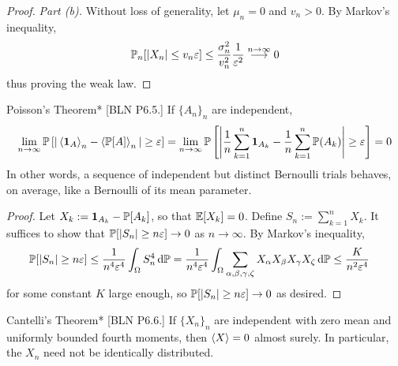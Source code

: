 \begin{proof}
    \emph{Part (b).} Without loss of generality, let \(\mu_n = 0\) and \(v_n > 0\). By Markov's inequality, 
    \[
        \mathbb{P}_n[|X_n| \leq v_n \varepsilon]
        \leq \frac{\sigma_n^2}{v_n^2} \frac{1}{\varepsilon^2} \stackrel{n \to \infty}{\longrightarrow} 0
    \]
    thus proving the weak law. 
\end{proof}


\begin{problem}{Poisson's Theorem}*
    [BLN P6.5.] If \(\{A_n\}_n\) are independent,
    \[
        \lim_{n \to \infty} \bb{P}\left[ |\ev{\mb{1}_A}_n - \ev{\bb{P}[A]}_n | \geq \varepsilon \right]
        = \lim_{n \to \infty} \bb{P}\left[ \left| \frac{1}{n} \sum_{k=1}^n \mb{1}_{A_k} - \frac{1}{n} \sum_{k=1}^n \bb{P}(A_k) \right| \geq \varepsilon \right] 
        = 0
    \]
    In other words, a sequence of independent but distinct Bernoulli trials behaves, on average, like a Bernoulli of its mean parameter.
\end{problem}

\begin{proof}
    Let \(X_k := \mathbf{1}_{A_k} - \mathbb{P}[A_k]\), so that \(\mathbb{E}[X_k] = 0\). Define \(S_n := \sum_{k=1}^n X_k\). It suffices to show that \(\mathbb{P}[|S_n| \geq n \varepsilon] \to 0\) as \(n \to \infty\). By Markov's inequality, 
    \begin{align*}
        \mathbb{P}[|S_n| \geq n \varepsilon] 
        &\leq \frac{1}{n^4 \varepsilon^4} \int_{\Omega} S_n^4 \, \mathrm{d}\mathbb{P}
        = \frac{1}{n^4 \varepsilon^4} \int_\Omega \sum_{\alpha,\beta,\gamma,\zeta} X_\alpha X_\beta X_\gamma X_\zeta \, \mathrm{d}\mathbb{P}
        \leq \frac{K}{n^2 \varepsilon^4} 
    \end{align*}
    for some constant \(K\) large enough, so \(\mathbb{P}[|S_n| \geq n \varepsilon] \to 0\) as desired. 
\end{proof}


\begin{problem}{Cantelli's Theorem}*
    [BLN P6.6.] If \(\{X_n\}_n\) are independent with zero mean and uniformly bounded fourth moments, then \(\ev{X} = 0\) almost surely. In particular, the \(X_n\) need not be identically distributed. 
\end{problem}


